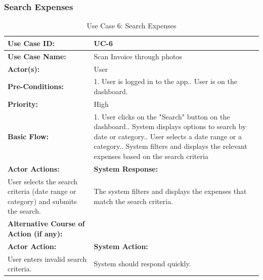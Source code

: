 \documentclass[12pt]{article}
\begin{document}
\newpage
\vspace{1 cm} %
\noindent
\subsubsection{Search Expenses}
\vspace{0.5 cm}
\begin{table}[H] %
    \centering
    \begin{tabular}{|p{4cm}|p{10cm}|}
        \hline
        \textbf{Use Case ID:} & UC-6 \\ \hline
        \textbf{Use Case Name:} & Scan Invoice through photos \\ \hline
        \textbf{Actor(s):} & User \\ \hline
        \textbf{Pre-Conditions:} & 
        1. User is logged in to the app.\newline
2. User is on the dashboard. \\ \hline
        \textbf{Priority:} & High \\ \hline
        \textbf{Basic Flow:} & 1. User clicks on the "Search" button on the dashboard.\newline
2. System displays options to search by date or category.\newline
3. User selects a date range or a category.\newline
4. System filters and displays the relevant expenses based on the search criteria\\ \hline
        \textbf{Actor Actions:} & \textbf{System Response:} \\ \hline
        User selects the search criteria (date range or category) and submits the search.& The system filters and displays the expenses that match the search criteria. \\ \hline
        \textbf{Alternative Course of Action (if any):} &  \\ \hline
        \textbf{Actor Action:} & \textbf{System Action:} \\ \hline
      User enters invalid search criteria. & System should respond quickly.\\ \hline               
    \end{tabular}
        \caption{Use Case 6: Search Expenses}
\end{table}
\newpage
\vspace{1 cm} %
\noindent
\end{document}
